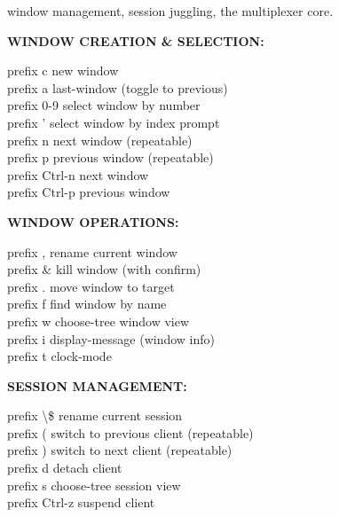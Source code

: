 \documentclass[11pt,a4paper,twoside]{book}
\begin{document}
window management, session juggling, the multiplexer core.


\vspace{12pt}
{\bfseries\color{neonyellow} WINDOW CREATION \& SELECTION:}\vspace{4pt}

\begin{codebox}
prefix c              new window\\
prefix a              last-window (toggle to previous)\\
prefix 0-9            select window by number\\
prefix '              select window by index prompt\\
prefix n              next window (repeatable)\\
prefix p              previous window (repeatable)\\
prefix Ctrl-n         next window\\
prefix Ctrl-p         previous window\\
\end{codebox}


\vspace{12pt}
{\bfseries\color{neonyellow} WINDOW OPERATIONS:}\vspace{4pt}

\begin{codebox}
prefix ,              rename current window\\
prefix \&              kill window (with confirm)\\
prefix .              move window to target\\
prefix f              find window by name\\
prefix w              choose-tree window view\\
prefix i              display-message (window info)\\
prefix t              clock-mode\\
\end{codebox}


\vspace{12pt}
{\bfseries\color{neonyellow} SESSION MANAGEMENT:}\vspace{4pt}

\begin{codebox}
prefix \textbackslash{}\$              rename current session\\
prefix (              switch to previous client (repeatable)\\
prefix )              switch to next client (repeatable)\\
prefix d              detach client\\
prefix s              choose-tree session view\\
prefix Ctrl-z         suspend client\\
\end{codebox}
\end{document}

